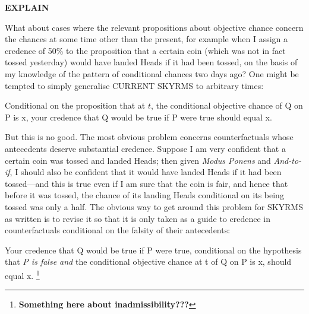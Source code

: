 \documentclass[leqno, 11pt, a5paper, openany]{article}
\begin{document}
\textbf{EXPLAIN}

What about cases where the relevant propositions about objective chance concern the chances at some time other than the present, for example when I assign a credence of 50\% to the proposition that a certain coin (which was not in fact tossed yesterday) would have landed Heads if it had been tossed, on the basis of my knowledge of the pattern of conditional chances two days ago? One might be tempted to simply generalise CURRENT SKYRMS to arbitrary times:
\begin{prop}
	\litem[SKYRMS] \label{skyrms}
	Conditional on the proposition that at $t$, the conditional objective chance of Q on P is x, your credence that Q would be true if P were true should equal x. 
\end{prop}
But this is no good. The most obvious problem concerns counterfactuals
whose antecedents deserve substantial credence. Suppose I am very
confident that a certain coin was tossed and landed Heads; then given
\emph{Modus Ponens} and \emph{And-to-if}, I should also be confident
that it would have landed Heads if it had been tossed---and this is true
even if I am sure that the coin is fair, and hence that before it was
tossed, the chance of its landing Heads conditional on its being tossed
was only a half. The obvious way to get around this problem for SKYRMS
as written is to revise it so that it is only taken as a guide to
credence in counterfactuals conditional on the falsity of their
antecedents:
\begin{prop}
	\litem[SKYRMS*] \label{false_antecedent_skyrms}
	Your credence that Q would be true if P were true, conditional on the hypothesis that \emph{P is false and} the conditional objective chance at t of Q on P is x, should equal x.%
	\footnote{\textbf{Something here about inadmissibility???}}
\end{prop}
\end{document}
